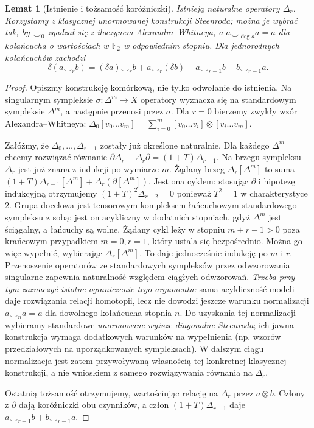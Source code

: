 \documentclass[11pt,a4paper,oneside]{report}
\newcommand{\F}{\mathbb{F}}
\theoremstyle{plain}
\newtheorem{lemat}[twierdzenie]{Lemat}
\theoremstyle{definition}
\theoremstyle{remark}
\begin{document}
\begin{lemat}[Istnienie i tożsamość koróżniczki]
\label{lem:cup-i-v7}
Istnieją naturalne operatory $\Delta_r$. Korzystamy
z klasycznej unormowanej konstrukcji Steenroda; można je
wybrać tak, by $\smile_0$ zgadzał się z iloczynem
Alexandra--Whitneya, a $a\smile_{\deg a}a=a$
dla kołańcucha o wartościach w $\F_2$ w odpowiednim
stopniu. Dla jednorodnych kołańcuchów zachodzi
\[
\delta(a\smile_r b)=(\delta a)\smile_r b
+a\smile_r(\delta b)+a\smile_{r-1}b+b\smile_{r-1}a.
\]
\end{lemat}
\begin{proof}
Opiszmy konstrukcję komórkową, nie tylko odwołanie
do istnienia. Na singularnym sympleksie $\sigma:\Delta^m\to X$
operatory wyznacza się na standardowym sympleksie
$\Delta^m$, a następnie przenosi przez $\sigma$.
Dla $r=0$ bierzemy zwykły wzór Alexandra--Whitneya:
\(\Delta_0[v_0\dots v_m]=
\sum_{i=0}^m[v_0\dots v_i]\otimes[v_i\dots v_m]\).

Załóżmy, że $\Delta_0,\ldots,\Delta_{r-1}$
zostały już określone naturalnie. Dla każdego
$\Delta^m$ chcemy rozwiązać równanie
$\partial\Delta_r+\Delta_r\partial=(1+T)\Delta_{r-1}$.
Na brzegu sympleksu $\Delta_r$ jest już znana
z indukcji po wymiarze $m$. Żądany brzeg
$\Delta_r[\Delta^m]$ to suma
$(1+T)\Delta_{r-1}[\Delta^m]
+\Delta_r(\partial[\Delta^m])$.
Jest ona cyklem: stosując $\partial$ i hipotezę
indukcyjną otrzymujemy $(1+T)^2\Delta_{r-2}=0$
ponieważ $T^2=1$ w charakterystyce $2$.
Grupa docelowa jest tensorowym kompleksem
łańcuchowym standardowego sympleksu z sobą;
jest on acykliczny w dodatnich stopniach, gdyż
$\Delta^m$ jest ściągalny, a łańcuchy są wolne.
Żądany cykl leży w stopniu $m+r-1>0$
poza krańcowym przypadkiem $m=0,r=1$,
który ustala się bezpośrednio. Można go więc
wypełnić, wybierając $\Delta_r[\Delta^m]$.
To daje jednocześnie indukcję po $m$ i $r$.
Przenoszenie operatorów ze standardowych sympleksów przez
odwzorowania singularne zapewnia naturalność względem
ciągłych odwzorowań. \emph{Trzeba przy tym zaznaczyć
istotne ograniczenie tego argumentu:} sama acykliczność
modeli daje rozwiązania relacji homotopii, lecz nie dowodzi
jeszcze warunku normalizacji
$a\smile_n a=a$ dla dowolnego kołańcucha stopnia $n$.
Do uzyskania tej normalizacji wybieramy standardowe
\emph{unormowane wyższe diagonalne Steenroda}; ich
jawna konstrukcja wymaga dodatkowych warunków na wypełnienia
(np. wzorów przedziałowych na uporządkowanych sympleksach).
W dalszym ciągu normalizacja jest zatem przywoływaną
własnością tej konkretnej klasycznej konstrukcji, a nie
wnioskiem z samego rozwiązywania równania na $\Delta_r$.

Ostatnią tożsamość otrzymujemy, wartościując relację
na $\Delta_r$ przez $a\otimes b$. Człony
z $\partial$ dają koróżniczki obu czynników,
a człon $(1+T)\Delta_{r-1}$ daje
$a\smile_{r-1}b+b\smile_{r-1}a$.
\end{proof}
\end{document}
